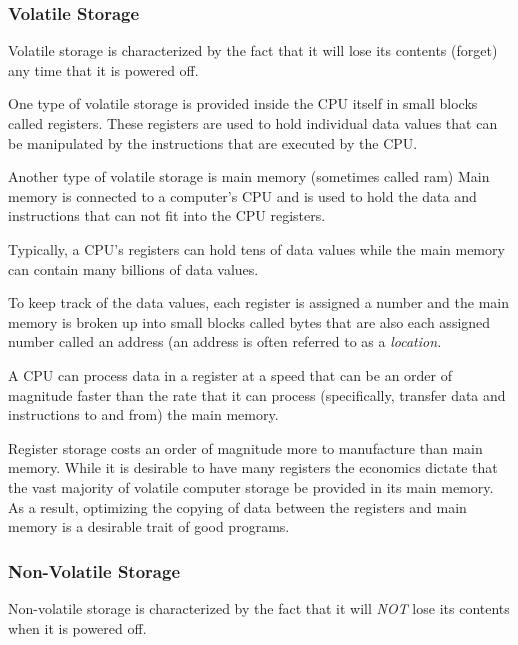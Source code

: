 \subsubsection{Volatile Storage}
\label{VolatileStorage}

Volatile storage is characterized by the fact that it will lose its
contents (forget) any time that it is powered off.

One type of volatile storage is provided inside the CPU itself in 
small blocks called \glspl{register}.  These registers are used to 
hold individual data values that can be manipulated by the instructions
that are executed by the CPU.  

Another type of volatile storage is main memory 
(sometimes called \acrshort{ram})
Main memory is connected to a computer's CPU and is used to hold
the data and instructions that can not fit into the CPU registers.

Typically, a CPU's registers can hold tens of data values while
the main memory can contain many billions of data values.

To keep track of the data values, each register is assigned a number and
the main memory is broken up into small blocks called \gls{byte}s that 
are also each assigned number called an \gls{address} 
(an address is often referred to as a {\em location.}

A CPU can process data in a register at a speed that can be an order 
of magnitude faster than the rate that it can process (specifically,
transfer data and instructions to and from) the main memory.  

Register storage costs an order of magnitude more to manufacture than
main memory.  While it is desirable to have many registers the economics 
dictate that the vast majority of volatile computer storage be provided
in its main memory.  As a result, optimizing the copying of data between 
the registers and main memory is a desirable trait of good programs.

\subsubsection{Non-Volatile Storage}

Non-volatile storage is characterized by the fact that it will {\em NOT} 
lose its contents when it is powered off.

